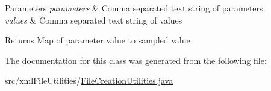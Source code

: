 \begin{DoxyParams}{Parameters}
{\em parameters} & Comma separated text string of parameters \\
\hline
{\em values} & Comma separated text string of values \\
\hline
\end{DoxyParams}
\begin{DoxyReturn}{Returns}
Map of parameter value to sampled value 
\end{DoxyReturn}


The documentation for this class was generated from the following file\+:\begin{DoxyCompactItemize}
\item 
src/xml\+File\+Utilities/\hyperlink{FileCreationUtilities_8java}{File\+Creation\+Utilities.\+java}\end{DoxyCompactItemize}
